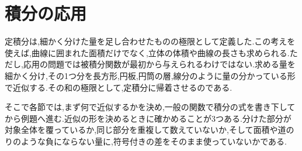 \chapter{積分の応用}\label{章:積分の応用}

定積分は,細かく分けた量を足し合わせたものの極限として定義した.この考えを使えば,曲線に囲まれた面積だけでなく,立体の体積や曲線の長さも求められる.ただし,応用の問題では被積分関数が最初から与えられるわけではない.求める量を細かく分け,その1つ分を長方形,円板,円筒の層,線分のように量の分かっている形で近似する.その和の極限として,定積分に帰着させるのである.

そこで各節では,まず何で近似するかを決め,一般の関数で積分の式を書き下してから例題へ進む.近似の形を決めるときに確かめることが3つある.分けた部分が対象全体を覆っているか,同じ部分を重複して数えていないか,そして面積や道のりのような負にならない量に,符号付きの差をそのまま使っていないかである.

%
%
%
%
%
%
%
%
%
